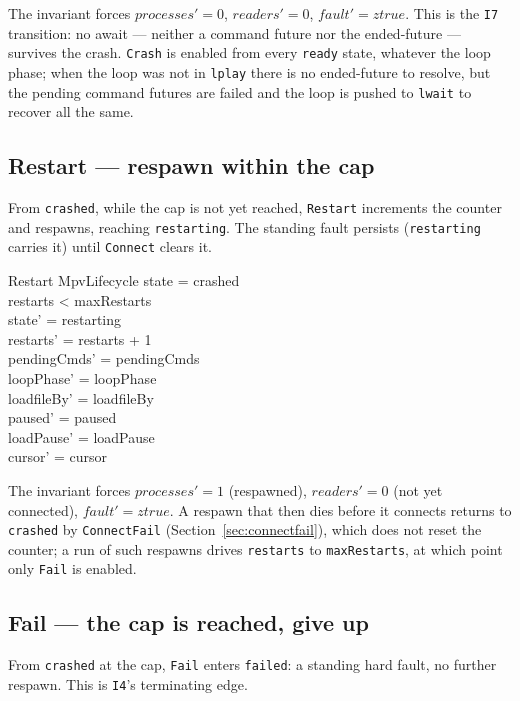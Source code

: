 \documentclass[a4paper,10pt,fleqn]{article}
\begin{document}
The invariant forces $processes' = 0$, $readers' = 0$, $fault' = ztrue$. This
is the \texttt{I7} transition: no await --- neither a command future nor the
ended-future --- survives the crash. \texttt{Crash} is enabled from every
\texttt{ready} state, whatever the loop phase; when the loop was not in
\texttt{lplay} there is no ended-future to resolve, but the pending command
futures are failed and the loop is pushed to \texttt{lwait} to recover all the
same.

\subsection{Restart --- respawn within the cap}
\label{sec:restart}

From \texttt{crashed}, while the cap is not yet reached, \texttt{Restart}
increments the counter and respawns, reaching \texttt{restarting}. The standing
fault persists (\texttt{restarting} carries it) until \texttt{Connect} clears
it.

\begin{schema}{Restart}
  \Delta MpvLifecycle
  \where
  state = crashed \\
  restarts < maxRestarts \\
  state' = restarting \\
  restarts' = restarts + 1 \\
  pendingCmds' = pendingCmds \\
  loopPhase' = loopPhase \\
  loadfileBy' = loadfileBy \\
  paused' = paused \\
  loadPause' = loadPause \\
  cursor' = cursor
\end{schema}

The invariant forces $processes' = 1$ (respawned), $readers' = 0$ (not yet
connected), $fault' = ztrue$. A respawn that then dies before it connects
returns to \texttt{crashed} by \texttt{ConnectFail} (Section~\ref{sec:connectfail}),
which does not reset the counter; a run of such respawns drives
\texttt{restarts} to \texttt{maxRestarts}, at which point only \texttt{Fail} is
enabled.

\subsection{Fail --- the cap is reached, give up}
\label{sec:fail}

From \texttt{crashed} at the cap, \texttt{Fail} enters \texttt{failed}: a
standing hard fault, no further respawn. This is \texttt{I4}'s terminating
edge.
\end{document}
